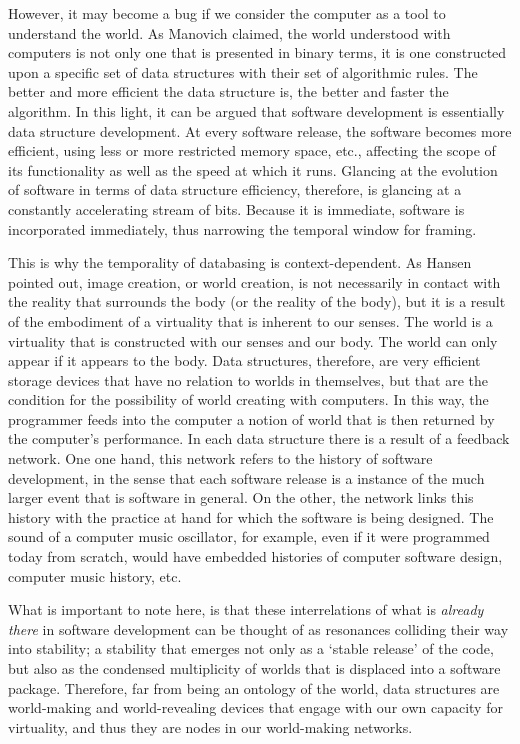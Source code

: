 However, it may become a bug if we consider the computer as a tool to understand the world. As Manovich claimed, the world understood with computers is not only one that is presented in binary terms, it is one constructed upon a specific set of data structures with their set of algorithmic rules. The better and more efficient the data structure is, the better and faster the algorithm. In this light, it can be argued that software development is essentially data structure development. At every software release, the software becomes more efficient, using less or more restricted memory space, etc., affecting the scope of its functionality as well as the speed at which it runs. Glancing at the evolution of software in terms of data structure efficiency, therefore, is glancing at a constantly accelerating stream of bits. Because it is immediate, software is incorporated immediately, thus narrowing the temporal window for framing.

This is why the temporality of databasing is context-dependent. As Hansen pointed out, image creation, or world creation, is not necessarily in contact with the reality that surrounds the body (or the reality of the body), but it is a result of the embodiment of a virtuality that is inherent to our senses. The world is a virtuality that is constructed with our senses and our body. The world can only appear if it appears to the body. Data structures, therefore, are very efficient storage devices that have no relation to worlds in themselves, but that are the condition for the possibility of world creating with computers. In this way, the programmer feeds into the computer a notion of world that is then returned by the computer's performance. In each data structure there is a result of a feedback network. One one hand, this network refers to the history of software development, in the sense that each software release is a instance of the much larger event that is software in general. On the other, the network links this history with the practice at hand for which the software is being designed. The sound of a computer music oscillator, for example, even if it were programmed today from scratch, would have embedded histories of computer software design, computer music history, etc.

What is important to note here, is that these interrelations of what is \textit{already there} in software development can be thought of as resonances colliding their way into stability; a stability that emerges not only as a `stable release' of the code, but also as the condensed multiplicity of worlds that is displaced into a software package. Therefore, far from being an ontology of the world, data structures are world-making and world-revealing devices that engage with our own capacity for virtuality, and thus they are nodes in our world-making networks.


